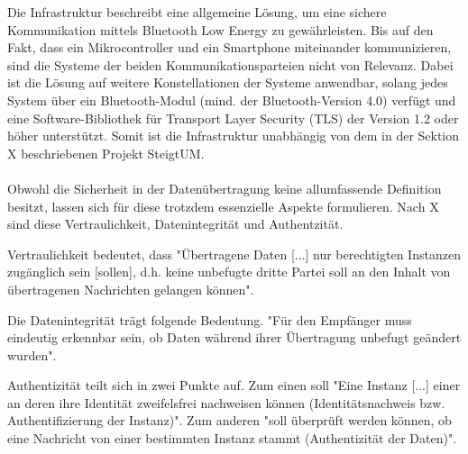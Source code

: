 Die Infrastruktur beschreibt eine allgemeine Lösung, um eine sichere Kommunikation mittels Bluetooth Low Energy zu gewährleisten. Bis auf den Fakt, dass ein Mikrocontroller und ein Smartphone miteinander kommunizieren, sind die Systeme der beiden Kommunikationsparteien nicht von Relevanz. Dabei ist die Lösung auf weitere Konstellationen der Systeme anwendbar, solang jedes System über ein Bluetooth-Modul (mind. der Bluetooth-Version 4.0) verfügt und eine Software-Bibliothek für Transport Layer Security (TLS) der Version 1.2 oder höher unterstützt. Somit ist die Infrastruktur unabhängig von dem in der Sektion X beschriebenen Projekt SteigtUM.
\\\\
Obwohl die Sicherheit in der Datenübertragung keine allumfassende Definition besitzt, lassen sich für diese trotzdem essenzielle Aspekte formulieren. Nach X 
sind diese Vertraulichkeit, Datenintegrität und Authentzität.

Vertraulichkeit bedeutet, dass "Übertragene Daten [...] nur berechtigten Instanzen zugänglich sein [sollen], d.h. keine unbefugte dritte Partei soll an den Inhalt von übertragenen Nachrichten gelangen können".

Die Datenintegrität trägt folgende Bedeutung. "Für den Empfänger muss eindeutig erkennbar sein, ob Daten während ihrer Übertragung unbefugt geändert wurden".

Authentizität teilt sich in zwei Punkte auf. Zum einen soll "Eine Instanz [...] einer an deren ihre Identität zweifelsfrei nachweisen können (Identitätsnachweis bzw. Authentifizierung der Instanz)". 
Zum anderen "soll überprüft werden können, ob eine Nachricht von einer bestimmten Instanz stammt (Authentizität der Daten)".
